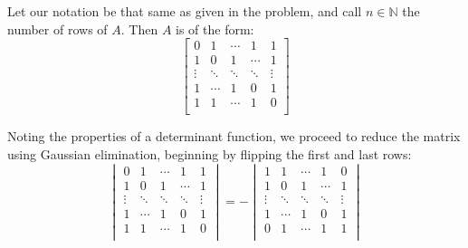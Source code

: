 \documentclass{article}
\begin{document}
\begin{solution}
Let our notation be that same as given in the problem, and call $n\in\mathbb{N}$ the number of rows of $A$. Then $A$ is of the form:
\[
\begin{bmatrix}
0 & 1 & \cdots & 1 & 1 \\
1 & 0 & 1 & \cdots & 1 \\
\vdots & \ddots & \ddots & \ddots & \vdots \\
1 & \cdots & 1 & 0 & 1 \\ 
1 & 1 & \cdots & 1 & 0 \\
\end{bmatrix}
\]

Noting the properties of a determinant function, we proceed to reduce the matrix using Gaussian elimination, beginning by flipping the first and last rows:
\[
\begin{vmatrix}
0 & 1 & \cdots & 1 & 1 \\
1 & 0 & 1 & \cdots & 1 \\
\vdots & \ddots & \ddots & \ddots & \vdots \\
1 & \cdots & 1 & 0 & 1 \\ 
1 & 1 & \cdots & 1 & 0 \\
\end{vmatrix}
= -
\begin{vmatrix}
1 & 1 & \cdots & 1 & 0 \\
1 & 0 & 1 & \cdots & 1 \\
\vdots & \ddots & \ddots & \ddots & \vdots \\
1 & \cdots & 1 & 0 & 1 \\ 
0 & 1 & \cdots & 1 & 1 \\
\end{vmatrix}
\]


\end{solution}
\end{document}
